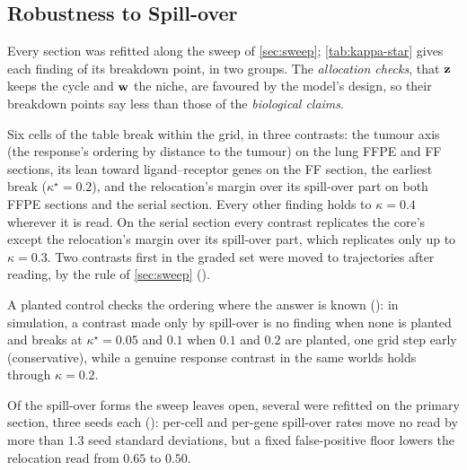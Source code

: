 \subsection{Robustness to Spill-over}
\label{sec:robustness}
\label{sec:results-sweep}



Every section was refitted along the sweep of \cref{sec:sweep}; \cref{tab:kappa-star} gives each finding of  its breakdown point, in two groups. The \emph{allocation checks}, that $\mathbf{z}$ keeps the cycle and $\mathbf{w}$ the niche, are favoured by the model's design, so their breakdown points say less than those of the \emph{biological claims}.

Six cells of the table break within the grid, in three contrasts: the tumour axis (the response's ordering by distance to the tumour) on the lung FFPE and FF sections, its lean toward ligand--receptor genes on the FF section, the earliest break ($\kappa^\star = 0.2$), and the relocation's margin over its spill-over part on both FFPE sections and the serial section. Every other finding holds to $\kappa = 0.4$ wherever it is read. On the serial section every contrast replicates the core's except the relocation's margin over its spill-over part, which replicates only up to $\kappa = 0.3$. Two contrasts first in the graded set were moved to trajectories after reading, by the rule of \cref{sec:sweep} ().

A planted control checks the ordering where the answer is known (): in simulation, a contrast made only by spill-over is no finding when none is planted and breaks at $\kappa^\star = 0.05$ and $0.1$ when $0.1$ and $0.2$ are planted, one grid step early (conservative), while a genuine response contrast in the same worlds holds through $\kappa = 0.2$.

Of the spill-over forms the sweep leaves open, several were refitted on the primary section, three seeds each (): per-cell and per-gene spill-over rates move no read by more than $1.3$ seed standard deviations, but a fixed false-positive floor lowers the relocation read from $0.65$ to $0.50$.
